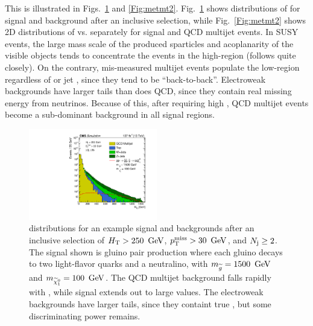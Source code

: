 This is illustrated in Figs.~\ref{Fig:inclusive_mt2} and \ref{Fig:metmt2}.
Fig.~\ref{Fig:inclusive_mt2} shows distributions of \mttwo for signal and background after an inclusive selection,
while Fig.~\ref{Fig:metmt2} shows 2D distributions of \mttwo vs. \ptmiss separately for signal and QCD multijet events.
In SUSY events, the large mass scale of the produced sparticles and acoplanarity of the visible objects tends to concentrate
the events in the high-\mttwo region (\mttwo follows \ptmiss quite closely). On the contrary, mis-measured multijet events
populate the low-\mttwo region regardless of \ptmiss or jet \pt, since they tend to be ``back-to-back''.
Electroweak backgrounds have larger \mttwo tails than does QCD, since they contain real missing energy from neutrinos.
Because of this, after requiring high \mttwo, QCD multijet events become a sub-dominant background in all signal regions.


\begin{figure}[ht]
  \begin{center}
    \includegraphics[width=0.50\textwidth]{figs/overview_mt2/inclusive_mt2.pdf}
    \caption{\mttwo distributions for an example signal and backgrounds after an inclusive selection of $H_{\mathrm{T}}>250~\,\text{Ge\hspace{-.08em}V}$, $p_{\mathrm{T}}^{\mathrm{miss}}>30~\,\text{Ge\hspace{-.08em}V}$, and $N_{\mathrm{j}}\geq2$.
      The signal shown is gluino pair production where each gluino decays to two light-flavor quarks and a neutralino, with 
      $m_{\widetilde{g}}=1500~\,\text{Ge\hspace{-.08em}V}$ and $m_{\widetilde{\chi}_1^0}=100~\,\text{Ge\hspace{-.08em}V}$.
      The QCD multijet background falls rapidly with \mttwo, while signal extends out to large values. The electroweak backgrounds
      have larger tails, since they containt true \ptmiss, but some discriminating power remains.
            }
    \label{Fig:inclusive_mt2}
  \end{center}
\end{figure}

